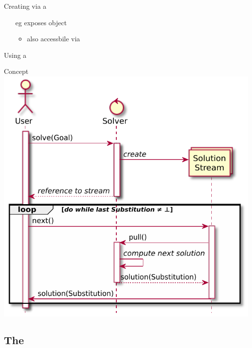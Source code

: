 \documentclass[handout]{beamer}
\begin{document}
\begin{frame}[allowframebreaks]{Creating  via a }
\begin{itemize}
        \item[eg]  exposes object 
        \begin{itemize}
            \item also accessbile via 
        \end{itemize} 
    \end{itemize}

    \framebreak


\end{frame}

\begin{frame}[allowframebreaks]{Using a }

    \begin{block}{Concept}
        \centering
        \includegraphics[width=.4\linewidth]{img/streamful-solver.pdf}
    \end{block}

    \framebreak

\end{frame}

\subsection{The }
\end{document}
